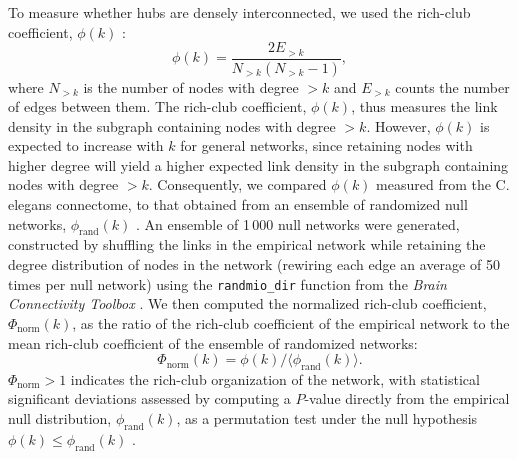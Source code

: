 \documentclass[10pt,letterpaper]{article}
\begin{document}
To measure whether hubs are densely interconnected, we used the rich-club coefficient, $\phi(k)$ \cite{Colizza:2006kz}:
\begin{equation}
    \label{eqn:rich_club}
    \phi(k) = \frac{2E_{>k}}{N_{>k}(N_{>k}-1)},
\end{equation}
where $N_{>k}$ is the number of nodes with degree $>k$ and $E_{>k}$ counts the number of edges between them.
The rich-club coefficient, $\phi(k)$, thus measures the link density in the subgraph containing nodes with degree $>k$.
However, $\phi(k)$ is expected to increase with $k$ for general networks, since retaining nodes with higher degree will yield a higher expected link density in the subgraph containing nodes with degree $>k$.
Consequently, we compared $\phi(k)$ measured from the C. elegans connectome, to that obtained from an ensemble of randomized null networks, $\phi_\mathrm{rand}(k)$ \cite{Colizza:2006kz}.
An ensemble of 1\,000 null networks were generated, constructed by shuffling the links in the empirical network while retaining the degree distribution of nodes in the network \cite{Maslov:2002hi} (rewiring each edge an average of 50 times per null network) using the \texttt{randmio\_dir} function from the {\it Brain Connectivity Toolbox} \cite{Rubinov:2010jd}.
We then computed the normalized rich-club coefficient, $\Phi_\mathrm{norm}(k)$, as the ratio of the rich-club coefficient of the empirical network to the mean rich-club coefficient of the ensemble of randomized networks:
\begin{equation}
    \Phi_\mathrm{norm}(k) = \phi(k)/\langle \phi_\mathrm{rand}(k) \rangle.
\end{equation}
$\Phi_\mathrm{norm} > 1$ indicates the rich-club organization of the network, with statistical significant deviations assessed by computing a $P$-value directly from the empirical null distribution, $\phi_\mathrm{rand}(k)$, as a permutation test under the null hypothesis $\phi(k) \leq \phi_\mathrm{rand}(k)$ \cite{vandenHeuvel:2011he}.

\end{document}
